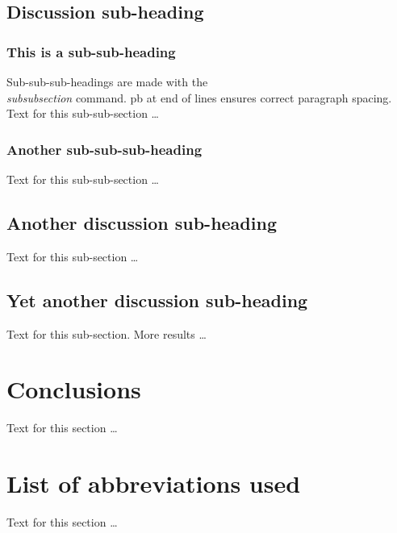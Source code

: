 \documentclass[10pt]{bmc_article}
\newenvironment{bmcformat}{\begin{raggedright}\baselineskip20pt\sloppy\setboolean{publ}{false}}{\end{raggedright}\baselineskip20pt\sloppy}
\begin{document}
\begin{bmcformat}
  \subsection*{Discussion sub-heading}
    \subsubsection*{This is a sub-sub-heading}
      Sub-sub-sub-headings are made with the \textsl{\\subsubsection} command. \pb
      pb at end of lines ensures correct paragraph spacing.\pb
	  Text for this sub-sub-section \ldots
    \subsubsection*{Another sub-sub-sub-heading}
      Text for this sub-sub-section \ldots

  \subsection*{Another discussion sub-heading}
    Text for this sub-section \ldots

  \subsection*{Yet another discussion sub-heading}
    Text for this sub-section.  More results \ldots


    


\section*{Conclusions}
  Text for this section \ldots


  

\section*{List of abbreviations used}
  Text for this section \ldots



\end{bmcformat}
\end{document}

